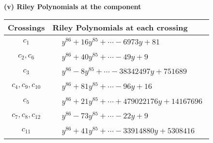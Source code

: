 \documentclass[1p]{elsarticle_modified}
\theoremstyle{definition}
\begin{document}
\flushleft \textbf{(v) Riley Polynomials at the component}\newline \\
\begin{tabular}{m{50pt}|m{274pt}}
Crossings & \hspace{64pt}Riley Polynomials at each crossing \\
\hline $$\begin{aligned}c_{1}\end{aligned}$$&$\begin{aligned}
&y^{86}+16 y^{85}+\cdots-6973 y+81
\end{aligned}$\\
\hline $$\begin{aligned}c_{2},c_{6}\end{aligned}$$&$\begin{aligned}
&y^{86}+40 y^{85}+\cdots-49 y+9
\end{aligned}$\\
\hline $$\begin{aligned}c_{3}\end{aligned}$$&$\begin{aligned}
&y^{86}-8 y^{85}+\cdots-38342497 y+751689
\end{aligned}$\\
\hline $$\begin{aligned}c_{4},c_{9},c_{10}\end{aligned}$$&$\begin{aligned}
&y^{86}+81 y^{85}+\cdots-96 y+16
\end{aligned}$\\
\hline $$\begin{aligned}c_{5}\end{aligned}$$&$\begin{aligned}
&y^{86}+21 y^{85}+\cdots+479022176 y+14167696
\end{aligned}$\\
\hline $$\begin{aligned}c_{7},c_{8},c_{12}\end{aligned}$$&$\begin{aligned}
&y^{86}-73 y^{85}+\cdots-22 y+9
\end{aligned}$\\
\hline $$\begin{aligned}c_{11}\end{aligned}$$&$\begin{aligned}
&y^{86}+41 y^{85}+\cdots-33914880 y+5308416
\end{aligned}$\\
\hline
\end{tabular}\\~\\
\end{document}
